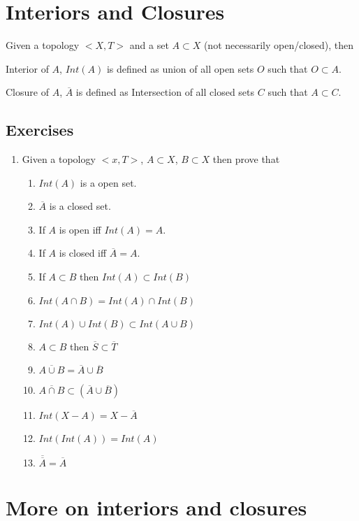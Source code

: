 \documentclass[twosides, openany]{tufte-book}
\begin{document}
\chapter{Interiors and Closures}
Given a topology $<X, T>$ and a set $A \subset X$ (not necessarily open/closed), then

Interior of $A$, $Int(A)$ is defined as union of all open sets $O$ such that $O \subset A$.

Closure of $A$, $\overline{A}$ is defined as Intersection of all closed sets $C$ such that $A \subset C$. 

\section{Exercises}
\begin{enumerate}
    \item Given a topology $<x, T>$, $A \subset X$, $B \subset X$  then prove that
    \begin{enumerate}
        \item $Int(A)$ is a open set.
        \item $\overline{A}$ is a closed set.
        \item If $A$ is open iff $Int(A) = A$.
        \item If $A$ is closed iff $\overline{A} = A$.
        \item If $A \subset B$ then $Int(A) \subset Int(B)$
        \item $Int(A \cap B) = Int(A) \cap Int(B)$
        \item $Int(A) \cup Int(B) \subset Int(A \cup B)$
        \item $A \subset B$ then $\overline{S} \subset \overline{T}$
        \item $\overline{A \cup B} = \overline{A} \cup \overline{B}$
        \item $\overline{A \cap B} \subset (\overline{A} \cup \overline{B})$
        \item $Int(X - A) = X - \overline{A}$
        \item $Int(Int(A)) = Int(A)$
        \item $\overline{\overline{A}} = \overline{A}$
    \end{enumerate}
\end{enumerate}

\chapter{More on interiors and closures}
\end{document}
